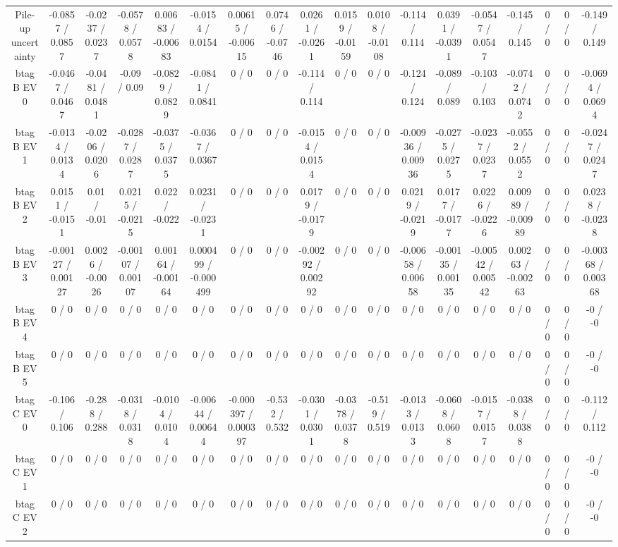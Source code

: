 \documentclass[10pt]{article}
\begin{document}
\begin{table}[htbp]
\begin{center}
\begin{tabular}{|c|c|c|c|c|c|c|c|c|c|c|c|c|c|c|c|c|c|}
  Pile-up uncertainty & -0.0857 / 0.0857 & -0.0237 / 0.0237 & -0.0578 / 0.0578 & 0.00683 / -0.00683 & -0.0154 / 0.0154 & 0.00615 / -0.00615 & 0.0746 / -0.0746 & 0.0261 / -0.0261 & 0.0159 / -0.0159 & 0.0108 / -0.0108 & -0.114 / 0.114 & 0.0391 / -0.0391 & -0.0547 / 0.0547 & -0.145 / 0.145 & 0 / 0 & 0 / 0 & -0.149 / 0.149 \\ 
  btag B EV 0 & -0.0467 / 0.0467 & -0.0481 / 0.0481 & -0.09 / 0.09 & -0.0829 / 0.0829 & -0.0841 / 0.0841 & 0 / 0 & 0 / 0 & -0.114 / 0.114 & 0 / 0 & 0 / 0 & -0.124 / 0.124 & -0.089 / 0.089 & -0.103 / 0.103 & -0.0742 / 0.0742 & 0 / 0 & 0 / 0 & -0.0694 / 0.0694 \\ 
  btag B EV 1 & -0.0134 / 0.0134 & -0.0206 / 0.0206 & -0.0287 / 0.0287 & -0.0375 / 0.0375 & -0.0367 / 0.0367 & 0 / 0 & 0 / 0 & -0.0154 / 0.0154 & 0 / 0 & 0 / 0 & -0.00936 / 0.00936 & -0.0275 / 0.0275 & -0.0237 / 0.0237 & -0.0552 / 0.0552 & 0 / 0 & 0 / 0 & -0.0247 / 0.0247 \\ 
  btag B EV 2 & 0.0151 / -0.0151 & 0.01 / -0.01 & 0.0215 / -0.0215 & 0.022 / -0.022 & 0.0231 / -0.0231 & 0 / 0 & 0 / 0 & 0.0179 / -0.0179 & 0 / 0 & 0 / 0 & 0.0219 / -0.0219 & 0.0177 / -0.0177 & 0.0226 / -0.0226 & 0.00989 / -0.00989 & 0 / 0 & 0 / 0 & 0.0238 / -0.0238 \\ 
  btag B EV 3 & -0.00127 / 0.00127 & 0.0026 / -0.0026 & -0.00107 / 0.00107 & 0.00164 / -0.00164 & 0.000499 / -0.000499 & 0 / 0 & 0 / 0 & -0.00292 / 0.00292 & 0 / 0 & 0 / 0 & -0.00658 / 0.00658 & -0.00135 / 0.00135 & -0.00542 / 0.00542 & 0.00263 / -0.00263 & 0 / 0 & 0 / 0 & -0.00368 / 0.00368 \\ 
  btag B EV 4 & 0 / 0 & 0 / 0 & 0 / 0 & 0 / 0 & 0 / 0 & 0 / 0 & 0 / 0 & 0 / 0 & 0 / 0 & 0 / 0 & 0 / 0 & 0 / 0 & 0 / 0 & 0 / 0 & 0 / 0 & 0 / 0 & -0 / -0 \\ 
  btag B EV 5 & 0 / 0 & 0 / 0 & 0 / 0 & 0 / 0 & 0 / 0 & 0 / 0 & 0 / 0 & 0 / 0 & 0 / 0 & 0 / 0 & 0 / 0 & 0 / 0 & 0 / 0 & 0 / 0 & 0 / 0 & 0 / 0 & -0 / -0 \\ 
  btag C EV 0 & -0.106 / 0.106 & -0.288 / 0.288 & -0.0318 / 0.0318 & -0.0104 / 0.0104 & -0.00644 / 0.00644 & -0.000397 / 0.000397 & -0.532 / 0.532 & -0.0301 / 0.0301 & -0.0378 / 0.0378 & -0.519 / 0.519 & -0.0133 / 0.0133 & -0.0608 / 0.0608 & -0.0157 / 0.0157 & -0.0388 / 0.0388 & 0 / 0 & 0 / 0 & -0.112 / 0.112 \\ 
  btag C EV 1 & 0 / 0 & 0 / 0 & 0 / 0 & 0 / 0 & 0 / 0 & 0 / 0 & 0 / 0 & 0 / 0 & 0 / 0 & 0 / 0 & 0 / 0 & 0 / 0 & 0 / 0 & 0 / 0 & 0 / 0 & 0 / 0 & -0 / -0 \\ 
  btag C EV 2 & 0 / 0 & 0 / 0 & 0 / 0 & 0 / 0 & 0 / 0 & 0 / 0 & 0 / 0 & 0 / 0 & 0 / 0 & 0 / 0 & 0 / 0 & 0 / 0 & 0 / 0 & 0 / 0 & 0 / 0 & 0 / 0 & -0 / -0 \\ 

\end{tabular}
\end{center}
\end{table}
\end{document}
